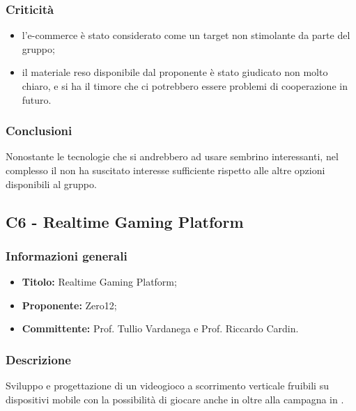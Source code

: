 \documentclass[]{article}
\begin{document}
			\subsubsection{Criticità}
			\begin{itemize}
			    \item l'e-commerce è stato considerato come un target non stimolante da parte del gruppo;
				\item il materiale reso disponibile dal proponente è stato giudicato non molto chiaro, e si ha il timore che ci potrebbero essere problemi di cooperazione in futuro.
			\end{itemize}

			\subsubsection{Conclusioni}
			Nonostante le tecnologie che si andrebbero ad usare sembrino interessanti, nel complesso il  non ha suscitato interesse sufficiente rispetto alle altre opzioni disponibili al gruppo.

		\newpage

        \subsection{C6 - Realtime Gaming Platform }
		\subsubsection{Informazioni generali}
		\begin{itemize}
			\item \textbf{Titolo:} Realtime Gaming Platform;
			\item \textbf{Proponente:} Zero12;
			\item \textbf{Committente:} Prof. Tullio Vardanega e Prof. Riccardo Cardin.
		\end{itemize}

		\subsubsection{Descrizione}
		Sviluppo e progettazione di un videogioco a scorrimento verticale fruibili su dispositivi mobile con la possibilità di giocare anche in  oltre alla campagna in .
\end{document}
